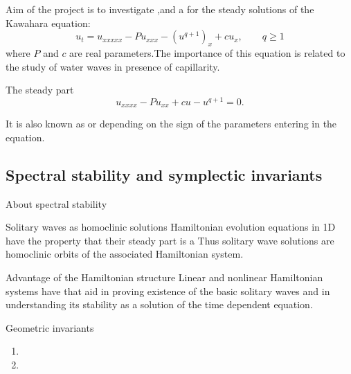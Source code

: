 \documentclass[9pt, english]{beamer}
\theoremstyle{definition}
\begin{document}
\begin{frame}{Aim of the project is to}
 investigate \pause {\color{red}{existence}\/},\pause {\color{red}{spectral
stability}\/}\pause and a {\color{red}{topological forcing
theory}\/} for the steady solutions of the Kawahara equation:\pause
\[
u_t=u_{xxxxx}-Pu_{xxx}-(u^{q+1})_x +c u_x, \qquad q \geq 1
\]
where $P$ and $ c$ are real parameters.\pause  The importance of
this equation is related to the study of water waves in presence of
capillarity.\pause

    \begin{block}{The steady part}
        \[
        u_{xxxx}-Pu_{xx} + cu -u^{q+1}=0.
        \]
    \end{block}\pause
        It is also known as {\color{red}{Swift-Hohenberg
        equation}\/} \pause or {\color{red}{extended Fisher-Kolmogorov
        equation}\/} depending on the sign of the parameters
        entering in the equation.
\end{frame}
\subsection{Spectral stability and symplectic invariants}
\begin{frame}{About spectral stability}\pause
    \begin{block}{Solitary waves as homoclinic solutions}\pause
        Hamiltonian evolution equations in 1D have the property that
        their steady part is a {\color{yellow}{finite-dimensional Hamiltonian
        system.}\/}\pause Thus solitary wave solutions are homoclinic
        orbits of the associated Hamiltonian system.
    \end{block}
    \pause
    \begin{block}{Advantage of the Hamiltonian structure}\pause
        Linear and nonlinear Hamiltonian systems have {\color{yellow}{global
        geometric properties}\/} that aid in proving existence of the
        basic solitary waves \pause and in understanding its stability as a
        solution of the time dependent equation.
    \end{block}\pause
    \begin{block}{Geometric invariants}\pause
    \begin{enumerate}
    \item {\color{yellow}{Maslov index}\/}\pause
    \item {\color{yellow}{Evans function}\/}
    \end{enumerate}
    \end{block}
    \end{frame}
\end{document}

